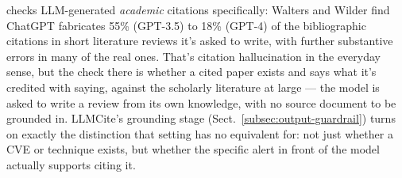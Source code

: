 \documentclass[pdflatex,sn-mathphys-num]{sn-jnl}%
\begin{document}
checks LLM-generated \textit{academic} citations specifically: Walters
and Wilder \cite{waltersfabrication2023} find ChatGPT fabricates 55\%
(GPT-3.5) to 18\% (GPT-4) of the bibliographic citations in short
literature reviews it's asked to write, with further substantive errors
in many of the real ones. That's citation hallucination in the everyday
sense, but the check there is whether a cited paper exists and says what
it's credited with saying, against the scholarly literature at large ---
the model is asked to write a review from its own knowledge, with no
source document to be grounded in. LLMCite's grounding stage
(Sect.~\ref{subsec:output-guardrail}) turns on exactly the distinction
that setting has no equivalent for: not just whether a CVE or technique
exists, but whether the specific alert in front of the model actually
supports citing it.
\end{document}
